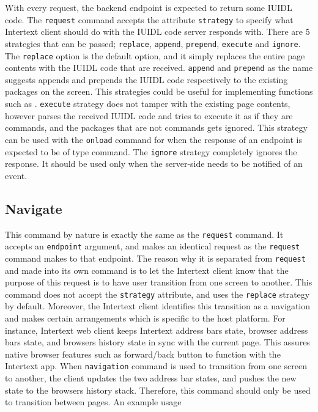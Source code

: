 With every request, the backend endpoint is expected to return some IUIDL code. The \texttt{request} command accepts the attribute \texttt{strategy} to specify what Intertext client should do with the IUIDL code server responds with. There are 5 strategies that can be passed; \texttt{replace}, \texttt{append}, \texttt{prepend}, \texttt{execute} and \texttt{ignore}. The \texttt{replace} option is the default option, and it simply replaces the entire page contents with the IUIDL code that are received. \texttt{append} and \texttt{prepend} as the name suggests appends and prepends the IUIDL code respectively to the existing packages on the screen. This strategies could be useful for implementing functions such as . \texttt{execute} strategy does not tamper with the existing page contents, however parses the received IUIDL code and tries to execute it as if they are commands, and the packages that are not commands gets ignored. This strategy can be used with the \texttt{onload} command for when the response of an endpoint is expected to be of type command. The \texttt{ignore} strategy completely ignores the response. It should be used only when the server-side needs to be notified of an event.

\subsection{Navigate}

This command by nature is exactly the same as the \texttt{request} command. It accepts an \texttt{endpoint} argument, and makes an identical request as the \texttt{request} command makes to that endpoint. The reason why it is separated from \texttt{request} and made into its own command is to let the Intertext client know that the purpose of this request is to have user transition from one screen to another. This command does not accept the \texttt{strategy} attribute, and uses the \texttt{replace} strategy by default. Moreover, the Intertext client identifies this transition as a navigation and makes certain arrangements which is specific to the host platform. For instance, Intertext web client keeps Intertext address bars state, browser address bars state, and browsers history state in sync with the current page. This assures native browser features such as forward/back button to function with the Intertext app. When \texttt{navigation} command is used to transition from one screen to another, the client updates the two address bar states, and pushes the new state to the browsers history stack. Therefore, this command should only be used to transition between pages. An example usage 


